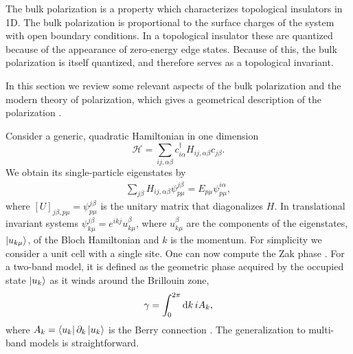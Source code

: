 \documentclass[twocolumn,amsmath,longbibliography,amssymb,superscriptaddress]{revtex4-1}
\begin{document}
The bulk polarization is a property which characterizes topological insulators in 1D. The bulk polarization is proportional to the surface charges of the system with open boundary conditions. In a topological insulator these are quantized because of the appearance of zero-energy edge states. Because of this, the bulk polarization is itself quantized, and therefore serves as a topological invariant.

In this section we review some relevant aspects of the bulk polarization and the modern theory of polarization, which gives a geometrical description of the polarization \cite{Resta1992,KingSmith1993,Vanderbilt1993,Resta1997}. 

Consider a generic, quadratic Hamiltonian in one dimension
\begin{equation}\label{eq:quadr_Ham}
\mathcal{H} = \sum_{ij,\alpha\beta} c_{i\alpha}^\dagger H_{ij,\alpha \beta}c_{j\beta}.
\end{equation}
We obtain its single-particle eigenstates by
\begin{align}
\sum_{j\beta}H_{ij,\alpha\beta} \psi_{p\mu}^{j\beta} = E_{p\mu} \psi^{i\alpha}_{p\mu},
\end{align}
where $[U]_{j\beta,p\mu} = \psi_{p\mu}^{j\beta}$ is the unitary matrix that diagonalizes $H$. In translational invariant systems $\psi_{k\mu}^{j\beta} = e^{ikj}u_{k \mu}^{\beta}$, where $u_{k \mu}^{\beta}$ are the components of the eigenstates, $\ket{u_{k\mu}}$, of the Bloch Hamiltonian and $k$ is the momentum. For simplicity we consider a unit cell with a single site. One can now compute the Zak phase \cite{Zak1989}.
 For a two-band  model, it is defined as the geometric phase acquired by the occupied state $\ket{u_k}$ as it winds around the Brillouin zone,
\begin{equation}
\gamma = \int_{0}^{2\pi} {\rm d}k\, i A_k, 
\label{eq:zak_phase}
\end{equation}
where $A_k = \bra{u_k}\partial_k \ket{u_k}$ is the Berry connection \cite{Berry1984}. 
The generalization to multi-band models is straightforward. 
\end{document}
